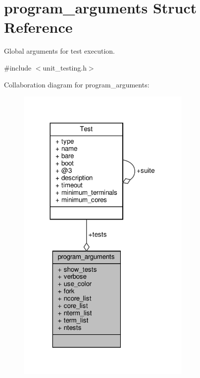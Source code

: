 \hypertarget{structprogram__arguments}{}\section{program\+\_\+arguments Struct Reference}
\label{structprogram__arguments}


Global arguments for test execution.  




{\ttfamily \#include $<$unit\+\_\+testing.\+h$>$}



Collaboration diagram for program\+\_\+arguments\+:
\nopagebreak
\begin{figure}[H]
\begin{center}
\leavevmode
\includegraphics[width=239pt]{structprogram__arguments__coll__graph}
\end{center}
\end{figure}
